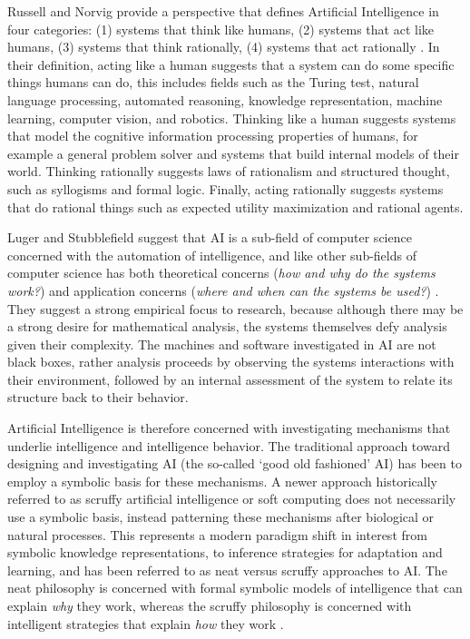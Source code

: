 \begin{bibunit}
Russell and Norvig provide a perspective that defines Artificial Intelligence in four categories: (1) systems that think like humans, (2) systems that act like humans, (3) systems that think rationally, (4) systems that act rationally \cite{Russell2009}. In their definition, acting like a human suggests that a system can do some specific things humans can do, this includes fields such as the Turing test, natural language processing, automated reasoning, knowledge representation, machine learning, computer vision, and robotics. Thinking like a human suggests systems that model the cognitive information processing properties of humans, for example a general problem solver and systems that build internal models of their world. Thinking rationally suggests laws of rationalism and structured thought, such as syllogisms and formal logic. Finally, acting rationally suggests systems that do rational things such as expected utility maximization and rational agents. 

Luger and Stubblefield suggest that AI is a sub-field of computer science concerned with the automation of intelligence, and like other sub-fields of computer science has both theoretical concerns (\emph{how and why do the systems work?}) and application concerns (\emph{where and when can the systems be used?}) \cite{Luger1993}. They suggest a strong empirical focus to research, because although there may be a strong desire for mathematical analysis, the systems themselves defy analysis given their complexity. The machines and software investigated in AI are not black boxes, rather analysis proceeds by observing the systems interactions with their environment, followed by an internal assessment of the system to relate its structure back to their behavior.

Artificial Intelligence is therefore concerned with investigating mechanisms that underlie intelligence and intelligence behavior. The traditional approach toward designing and investigating AI (the so-called `good old fashioned' AI) has been to employ a symbolic basis for these mechanisms. A newer approach historically referred to as scruffy artificial intelligence or soft computing does not necessarily use a symbolic basis, instead patterning these mechanisms after biological or natural processes. This represents a modern paradigm shift in interest from symbolic knowledge representations, to inference strategies for adaptation and learning, and has been referred to as neat versus scruffy approaches to AI. The neat philosophy is concerned with formal symbolic models of intelligence that can explain \emph{why} they work, whereas the scruffy philosophy is concerned with intelligent strategies that explain \emph{how} they work \cite{Sloman1990}.


\end{bibunit}
